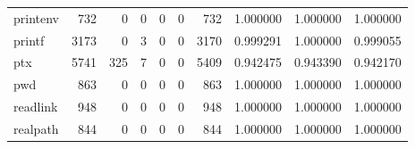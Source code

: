 \begin{tabular}{lrrrrrrrrr}
printenv  &                                                732 &                                                  0 &                                                  0 &                                                  0 &                                                  0 &                                                732 &                                           1.000000 &                               1.000000 &                             1.000000 \\
printf    &                                               3173 &                                                  0 &                                                  3 &                                                  0 &                                                  0 &                                               3170 &                                           0.999291 &                               1.000000 &                             0.999055 \\
ptx       &                                               5741 &                                                325 &                                                  7 &                                                  0 &                                                  0 &                                               5409 &                                           0.942475 &                               0.943390 &                             0.942170 \\
pwd       &                                                863 &                                                  0 &                                                  0 &                                                  0 &                                                  0 &                                                863 &                                           1.000000 &                               1.000000 &                             1.000000 \\
readlink  &                                                948 &                                                  0 &                                                  0 &                                                  0 &                                                  0 &                                                948 &                                           1.000000 &                               1.000000 &                             1.000000 \\
realpath  &                                                844 &                                                  0 &                                                  0 &                                                  0 &                                                  0 &                                                844 &                                           1.000000 &                               1.000000 &                             1.000000 \\

\end{tabular}
